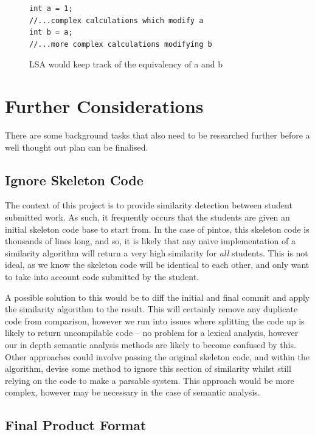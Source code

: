 \begin{figure}[ht!]
\centering
\begin{verbatim}int a = 1;
//...complex calculations which modify a
int b = a;
//...more complex calculations modifying b
\end{verbatim}
\caption{LSA would keep track of the equivalency of a and b}
\label{fig:simpleLSACode}
\end{figure}

\section{Further Considerations}

There are some background tasks that also need to be researched further before a
well thought out plan can be finalised.

\subsection{Ignore Skeleton Code}

The context of this project is to provide similarity detection between student
submitted work. As such, it frequently occurs that the students are given an
initial skeleton code base to start from. In the case of pintos, this skeleton code
is thousands of lines long, and so, it is likely that any na\"{\i}ve implementation
of a similarity algorithm will return a very high similarity for \emph{all}
students. This is not ideal, as we know the skeleton code will be identical to
each other, and only want to take into account code submitted by the student.

A possible solution to this would be to diff the initial and final commit and
apply the similarity algorithm to the result. This will certainly remove any 
duplicate code from comparison, however we run into issues where splitting
the code up is likely to return uncompilable code -- no problem for a lexical
analysis, however our in depth semantic analysis methods are likely to become
confused by this. Other approaches could involve passing the original skeleton 
code, and within the algorithm, devise some method to ignore this section of
similarity whilst still relying on the code to make a parsable system. This
approach would be more complex, however may be necessary in the case of semantic
analysis.

\subsection{Final Product Format}

